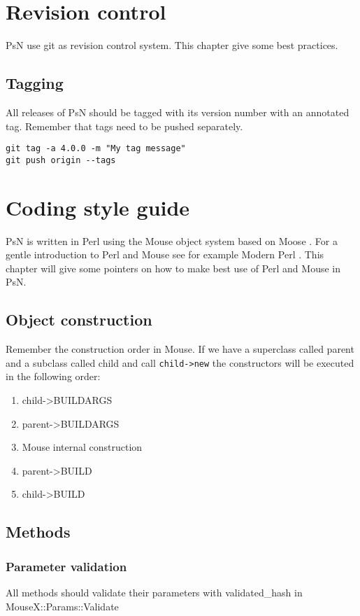 \section{Revision control}
PsN use git as revision control system. This chapter give some best practices.

\subsection{Tagging}
All releases of PsN should be tagged with its version number with an annotated tag. Remember
that tags need to be pushed separately.
\begin{verbatim}
git tag -a 4.0.0 -m "My tag message"
git push origin --tags
\end{verbatim}

\section{Coding style guide}
PsN is written in Perl using the Mouse object system based on Moose \cite{Moose}. For a gentle introduction to Perl and Mouse see for example Modern Perl \cite{modern}. This chapter will give some pointers on how to make best use of Perl and Mouse in PsN.

\subsection{Object construction}

Remember the construction order in Mouse. If we have a superclass called parent and a subclass called child and call \verb|child->new| the constructors will be executed in the following order:

\begin{enumerate}
	\item child->BUILDARGS
	\item parent->BUILDARGS
	\item Mouse internal construction
	\item parent->BUILD
	\item child->BUILD
\end{enumerate}


\subsection{Methods}

\subsubsection{Parameter validation}
All methods should validate their parameters with validated\_hash in\\ \mbox{MouseX::Params::Validate}

